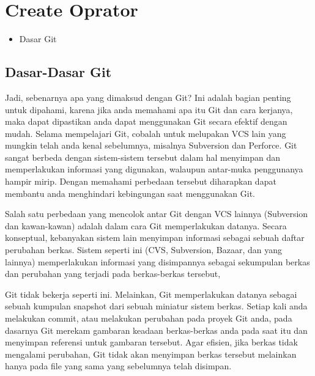 
\section{Create Oprator}

\vspace{\baselineskip}
\begin{itemize}
	\item Dasar Git
\end{itemize}

\vspace{\baselineskip}
\noindent 
{\fontsize{14pt}{14pt}\subsection{Dasar-Dasar Git}
	\vspace{\baselineskip}
	\noindent 
	{\fontsize{14pt}{14pt}\selectfont
	 Jadi, sebenarnya apa yang dimaksud dengan Git? Ini adalah bagian penting untuk dipahami, karena jika anda memahami apa itu Git dan cara kerjanya, maka dapat dipastikan anda dapat menggunakan Git secara efektif dengan mudah. Selama mempelajari Git, cobalah untuk melupakan VCS lain yang mungkin telah anda kenal sebelumnya, misalnya Subversion dan Perforce. Git sangat berbeda dengan sistem-sistem tersebut dalam hal menyimpan dan memperlakukan informasi yang digunakan, walaupun antar-muka penggunanya hampir mirip. Dengan memahami perbedaan tersebut diharapkan dapat membantu anda menghindari kebingungan saat menggunakan Git. \\} \par

\vspace{\baselineskip}
\noindent 
{\fontsize{14pt}{14pt}\selectfont Salah satu perbedaan yang mencolok antar Git dengan VCS lainnya (Subversion dan kawan-kawan) adalah dalam cara Git memperlakukan datanya. Secara konseptual, kebanyakan sistem lain menyimpan informasi sebagai sebuah daftar perubahan berkas. Sistem seperti ini (CVS, Subversion, Bazaar, dan yang lainnya) memperlakukan informasi yang disimpannya sebagai sekumpulan berkas dan perubahan yang terjadi pada berkas-berkas tersebut, \\} \par

\vspace{\baselineskip}
\vspace{14pt}
\noindent 
{\fontsize{14pt}{14pt}\selectfont Git tidak bekerja seperti ini. Melainkan, Git memperlakukan datanya sebagai sebuah kumpulan snapshot dari sebuah miniatur sistem berkas. Setiap kali anda melakukan commit, atau melakukan perubahan pada proyek Git anda, pada dasarnya Git merekam gambaran keadaan berkas-berkas anda pada saat itu dan menyimpan referensi untuk gambaran tersebut. Agar efisien, jika berkas tidak mengalami perubahan, Git tidak akan menyimpan berkas tersebut melainkan hanya pada file yang sama yang sebelumnya telah disimpan. \\} \par

}
